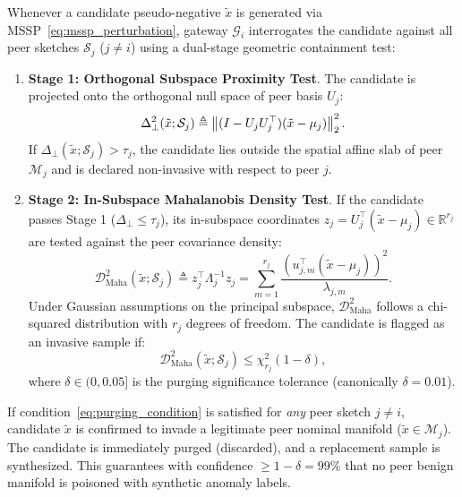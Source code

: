 Whenever a candidate pseudo-negative $\tilde{x}$ is generated via MSSP~\eqref{eq:mssp_perturbation}, gateway $\mathcal{G}_i$ interrogates the candidate against all peer sketches $\mathcal{S}_j$ ($j \neq i$) using a dual-stage geometric containment test:
\begin{enumerate}
    \item \textbf{Stage 1: Orthogonal Subspace Proximity Test}. The candidate is projected onto the orthogonal null space of peer basis $U_j$:
    \begin{equation}
    \label{eq:test_residual}
    \Delta_{\perp}^2(\tilde{x}; \mathcal{S}_j) \triangleq \left\lVert(I - U_j U_j^\top)(\tilde{x} - \mu_j)\right\rVert_2^2.
    \end{equation}
    If $\Delta_{\perp}(\tilde{x}; \mathcal{S}_j) > \tau_j$, the candidate lies outside the spatial affine slab of peer $\mathcal{M}_j$ and is declared non-invasive with respect to peer $j$.
    \item \textbf{Stage 2: In-Subspace Mahalanobis Density Test}. If the candidate passes Stage 1 ($\Delta_{\perp} \le \tau_j$), its in-subspace coordinates $z_j = U_j^\top (\tilde{x} - \mu_j) \in \mathbb{R}^{r_j}$ are tested against the peer covariance density:
    \begin{equation}
    \label{eq:test_mahalanobis}
    \mathcal{D}_{\text{Maha}}^2(\tilde{x}; \mathcal{S}_j) \triangleq z_j^\top \Lambda_j^{-1} z_j = \sum_{m=1}^{r_j} \frac{(u_{j,m}^\top (\tilde{x} - \mu_j))^2}{\lambda_{j,m}}.
    \end{equation}
    Under Gaussian assumptions on the principal subspace, $\mathcal{D}_{\text{Maha}}^2$ follows a chi-squared distribution with $r_j$ degrees of freedom. The candidate is flagged as an invasive sample if:
    \begin{equation}
    \label{eq:purging_condition}
    \mathcal{D}_{\text{Maha}}^2(\tilde{x}; \mathcal{S}_j) \le \chi^2_{r_j}(1 - \delta),
    \end{equation}
    where $\delta \in (0, 0.05]$ is the purging significance tolerance (canonically $\delta = 0.01$).
\end{enumerate}

If condition~\eqref{eq:purging_condition} is satisfied for \emph{any} peer sketch $j \neq i$, candidate $\tilde{x}$ is confirmed to invade a legitimate peer nominal manifold ($\tilde{x} \in \mathcal{M}_j$). The candidate is immediately purged (discarded), and a replacement sample is synthesized. This guarantees with confidence $\ge 1 - \delta = 99\%$ that no peer benign manifold is poisoned with synthetic anomaly labels.

